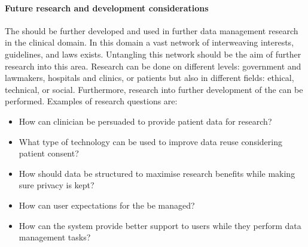 \paragraph{Future research and development considerations}
The \ivfsystem{} should be further developed and used in further data management research in the clinical domain.
In this domain a vast network of interweaving interests, guidelines, and laws exists.
Untangling this network should be the aim of further research into this area.
Research can be done on different levels: government and lawmakers, hospitals and clinics, or patients but also in different fields: ethical, technical, or social.
Furthermore, research into further development of the \ivfsystem{} can be performed.
Examples of research questions are:

\begin{itemize}
	\item How can clinician be persuaded to provide patient data for research?
	\item What type of technology can be used to improve data reuse considering patient consent?
	\item How should data be structured to maximise research benefits while making sure privacy is kept?
	\item How can user expectations for the \ivfsystem{} be managed?
	\item How can the system provide better support to users while they perform data management tasks?
\end{itemize}